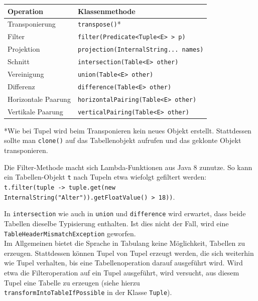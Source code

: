 \begin{center}
    \begin{tabular}{ |l|l| } 
        \hline
        Operation & Klassenmethode \\ 
        \hline
        Transponierung & \texttt{transpose()}* \\ 
        Filter & \texttt{filter(Predicate<Tuple<E> > p)} \\
        Projektion & \texttt{projection(InternalString... names)} \\
        Schnitt & \texttt{intersection(Table<E> other)} \\
        Vereinigung & \texttt{union(Table<E> other)} \\
        Differenz & \texttt{difference(Table<E> other)} \\
        Horizontale Paarung & \texttt{horizontalPairing(Table<E> other)} \\
        Vertikale Paarung & \texttt{verticalPairing(Table<E> other)} \\
        \hline
    \end{tabular}
\end{center}

*Wie bei Tupel wird beim Transponieren kein neues Objekt erstellt. Stattdessen sollte man \lstinline{clone()} auf das Tabellenobjekt aufrufen und
das geklonte Objekt transponieren.

Die Filter-Methode macht sich Lambda-Funktionen aus Java 8 zunutze. So kann ein Tabellen-Objekt \lstinline{t} nach Tupeln etwa wiefolgt gefiltert werden:\\
\lstinline{t.filter(tuple -> tuple.get(new InternalString("Alter")).getFloatValue() > 18))}.

In \lstinline{intersection} wie auch in \lstinline{union} und \lstinline{difference} wird erwartet, dass beide Tabellen dieselbe Typisierung enthalten.
Ist dies nicht der Fall, wird eine \lstinline{TableHeaderMismatchException} geworfen.\\

Im Allgemeinen bietet die Sprache in Tabulang keine Möglichkeit, Tabellen zu erzeugen.
Stattdessen können Tupel von Tupel erzeugt werden, die sich weiterhin wie Tupel verhalten, bis eine Tabellenoperation darauf
ausgeführt wird. Wird etwa die Filteroperation auf ein Tupel ausgeführt, wird versucht, aus diesem Tupel eine
Tabelle zu erzeugen (siehe hierzu\\
\lstinline{transformIntoTableIfPossible} in der Klasse \lstinline{Tuple}).

